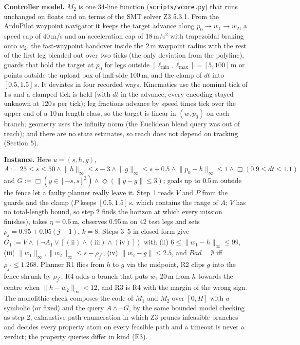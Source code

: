 \documentclass[10pt,a4paper]{article}
\newcommand{\Bad}{\mathit{Bad}}
\newcommand{\lt}[1]{\texttt{#1}}
\begin{document}
\textbf{Controller model.} $M_2$ is one 34-line function (\lt{scripts/vcore.py}) that runs unchanged on floats and on terms of the SMT solver Z3 5.3.1. From the ArduPilot waypoint navigator it keeps the target advance along $p_0\to w_1\to w_2$, a speed cap of 40\,m/s and an acceleration cap of 18\,m/s$^2$ with trapezoidal braking onto $w_2$, the fast-waypoint handover inside the 2\,m waypoint radius with the rest of the first leg blended out over two ticks (the only deviation from the polyline), guards that hold the target at $p_0$ for legs outside $[\ell_{\min},\ell_{\max}]=[5,100]$\,m or points outside the upload box of half-side 100\,m, and the clamp of $dt$ into $[0.5,1.5]$\,s. It deviates in four recorded ways. Kinematics use the nominal tick of 1\,s and a clamped tick is held (with $dt$ in the advance, every encoding stayed unknown at 120\,s per tick); leg fractions advance by speed times tick over the upper end of a 10\,m length class, so the target is linear in $(w,p_0)$ on each branch; geometry uses the infinity norm (the Euclidean blend query was out of reach); and there are no state estimates, so reach does not depend on tracking (Section 5).

\textbf{Instance.} Here $u=(s,h,g)$, $A:=25\le s\le50\wedge\lVert h\rVert_\infty\le s-3\wedge\lVert g\rVert_\infty\le s+0.5\wedge\lVert p_0-h\rVert_\infty\le1\wedge\Box(0.9\le dt\le1.1)$ and $G:=\Box(y\in[-s,s]^2)\wedge\Diamond(\lVert y-g\rVert\le3)$; goals up to 0.5\,m outside the fence let a faulty planner really leave it. Step 1 reads $V$ and $P$ from the guards and the clamp ($P$ keeps $[0.5,1.5]$\,s, which contains the range of $A$; $V$ has no total-length bound, so step 2 finds the horizon at which every mission finishes), takes $\eta=0.5$\,m, observes 0.95\,m on 42 test legs and sets $\rho_j=0.95+0.05(j-1)$, $k=8$. Steps 3--5 in closed form give $G_1:=V\wedge(\lnot A_1\vee[\mathrm{(ii)}\wedge\mathrm{(iii)}\wedge\mathrm{(iv)}])$ with (ii) $6\le\lVert w_1-h\rVert_\infty\le99$, (iii) $\lVert w_1\rVert_\infty,\lVert w_2\rVert_\infty\le s-\rho_{j^*}$, (iv) $\lVert w_2-g\rVert\le2.5$, and $\Bad=\emptyset$ iff $\rho_{j^*}\le1.268$. Planner R1 flies from $h$ to $g$ via the midpoint, R2 clips $g$ into the fence shrunk by $\rho_{j^*}$, R4 adds a branch that puts $w_1$ 20\,m from $h$ towards the centre when $\lVert h-w_2\rVert_\infty<12$, and R3 is R4 with the margin of the wrong sign. The monolithic check composes the code of $M_1$ and $M_2$ over $[0,H]$ with $u$ symbolic (or fixed) and the query $A\wedge\lnot G$, by the same bounded model checking as step 2, exhaustive path enumeration in which Z3 prunes infeasible branches and decides every property atom on every feasible path and a timeout is never a verdict; the property queries differ in kind (E3).
\end{document}
